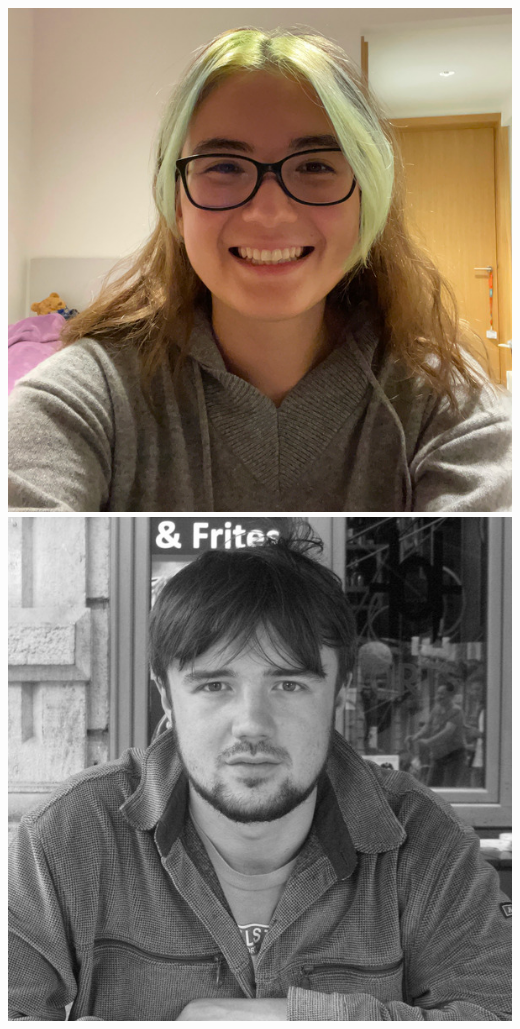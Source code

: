 \documentclass[aspectratio=169]{beamer}
\begin{document}
\begin{frame}
{        \includegraphics[width=0.09\textheight]{figures/students/sinah_legner.jpg}%
        \includegraphics[width=0.09\textheight]{figures/students/sam_leeney.jpg}%
}
\end{frame}
\end{document}
